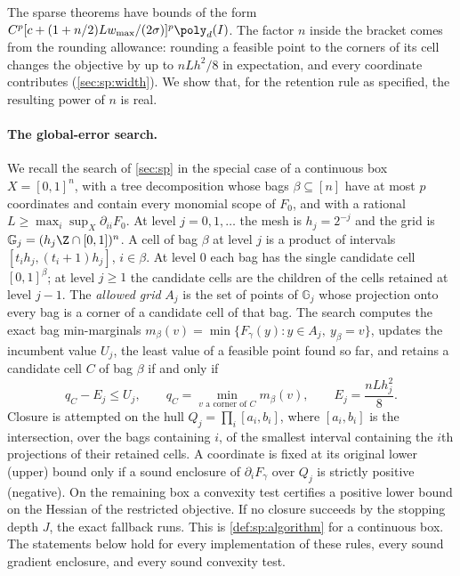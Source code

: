 The sparse theorems have bounds of the form
$C^p[c+(1+n/2)Lw_{\max}/(2\sigma)]^p\poly_d(I)$. The factor $n$ inside the
bracket comes from the rounding allowance: rounding a feasible point to the
corners of its cell changes the objective by up to $nLh^2/8$ in expectation,
and every coordinate contributes (\cref{sec:sp:width}). We show that, for
the retention rule as specified, the resulting power of $n$ is real.

\paragraph{The global-error search.}
We recall the search of \cref{sec:sp} in the special case of a continuous
box $X=[0,1]^n$, with a tree decomposition whose bags $\beta\subseteq[n]$
have at most $p$ coordinates and contain every monomial scope of $F_0$, and
with a rational $L\ge\max_i\sup_X\partial_{ii}F_0$. At level $j=0,1,\ldots$
the mesh is $h_j=2^{-j}$ and the grid is
$\mathbb G_j=(h_j\Z\cap[0,1])^n$. A cell of bag $\beta$ at level $j$ is a
product of intervals $[t_ih_j,(t_i+1)h_j]$, $i\in\beta$. At level $0$ each
bag has the single candidate cell $[0,1]^\beta$; at level $j\ge1$ the
candidate cells are the children of the cells retained at level $j-1$. The
\emph{allowed grid} $A_j$ is the set of points of $\mathbb G_j$ whose
projection onto every bag is a corner of a candidate cell of that bag. The
search computes the exact bag min-marginals
$m_\beta(v)=\min\{F_\gamma(y):y\in A_j,\ y_\beta=v\}$, updates the
incumbent value $U_j$, the least value of a feasible point found so far,
and retains a candidate cell $C$ of bag $\beta$ if and only if
\begin{equation}\label{eq:lim:retain}
 q_C-E_j\le U_j,\qquad
 q_C=\min_{v\text{ a corner of }C}m_\beta(v),\qquad
 E_j=\frac{nLh_j^2}8 .
\end{equation}
Closure is attempted on the hull $Q_j=\prod_i[a_i,b_i]$, where $[a_i,b_i]$
is the intersection, over the bags containing $i$, of the smallest interval
containing the $i$th projections of their retained cells. A coordinate is
fixed at its original lower (upper) bound only if a sound enclosure of
$\partial_iF_\gamma$ over $Q_j$ is strictly positive (negative). On the
remaining box a convexity test certifies a positive lower bound on the
Hessian of the restricted objective. If no closure succeeds by the stopping
depth $J$, the exact fallback runs. This is \cref{def:sp:algorithm} for a
continuous box. The statements below hold for every implementation of these
rules, every sound gradient enclosure, and every sound convexity test.

